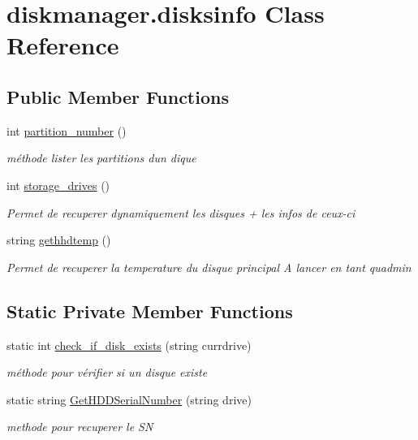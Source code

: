 \hypertarget{classdiskmanager_1_1disksinfo}{}\section{diskmanager.\+disksinfo Class Reference}
\label{classdiskmanager_1_1disksinfo}
\subsection*{Public Member Functions}
\begin{DoxyCompactItemize}
\item 
int \hyperlink{classdiskmanager_1_1disksinfo_ab5229bc8b8c66e1bb2de19aba8f6a130}{partition\+\_\+number} ()
\begin{DoxyCompactList}\small\item\em méthode lister les partitions d\textquotesingle{}un dique \end{DoxyCompactList}\item 
int \hyperlink{classdiskmanager_1_1disksinfo_ae387fb2ba0e32b521f377aa814f29508}{storage\+\_\+drives} ()
\begin{DoxyCompactList}\small\item\em Permet de recuperer dynamiquement les disques + les infos de ceux-\/ci \end{DoxyCompactList}\item 
string \hyperlink{classdiskmanager_1_1disksinfo_a452365cea042bea15219919d72c73d0d}{gethhdtemp} ()
\begin{DoxyCompactList}\small\item\em Permet de recuperer la temperature du disque principal A lancer en tant qu\textquotesingle{}admin \end{DoxyCompactList}\end{DoxyCompactItemize}
\subsection*{Static Private Member Functions}
\begin{DoxyCompactItemize}
\item 
static int \hyperlink{classdiskmanager_1_1disksinfo_a19e7f3c67bd27b94b5ee46157ace2bc8}{check\+\_\+if\+\_\+disk\+\_\+exists} (string currdrive)
\begin{DoxyCompactList}\small\item\em méthode pour vérifier si un disque existe \end{DoxyCompactList}\item 
static string \hyperlink{classdiskmanager_1_1disksinfo_a314d1116f663bdd1ba60a9966e2436fa}{Get\+H\+D\+D\+Serial\+Number} (string drive)
\begin{DoxyCompactList}\small\item\em methode pour recuperer le SN \end{DoxyCompactList}\end{DoxyCompactItemize}
